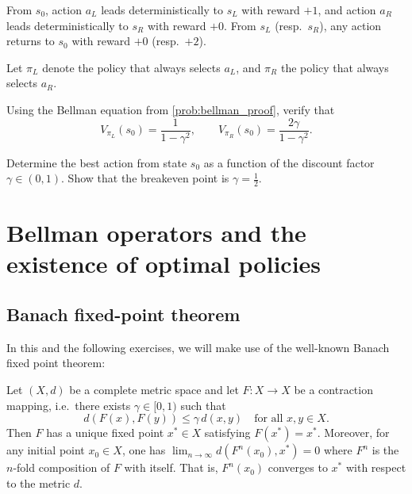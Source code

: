 \documentclass[11pt]{article}
\begin{document}
From $s_0$, action $a_L$ leads deterministically to $s_L$ with reward $+1$, and action $a_R$ leads deterministically to $s_R$ with reward $+0$. From $s_L$ (resp.\ $s_R$), any action returns to $s_0$ with reward $+0$ (resp.\ $+2$).

Let $\pi_L$ denote the policy that always selects $a_L$, and $\pi_R$ the policy that always selects $a_R$.

\begin{exercise}
\label{prob:small_mdp_values} Using the Bellman equation from \cref{prob:bellman_proof}, verify that
$$
V_{\pi_L}(s_0) = \frac{1}{1-\gamma^2}, \qquad V_{\pi_R}(s_0) = \frac{2\gamma}{1-\gamma^2}.
$$
\end{exercise}


\begin{exercise}
\label{prob:small_mdp_optimal} Determine the best action from state $s_0$ as a function of the discount factor $\gamma \in (0, 1)$. Show that the breakeven point is $\gamma = \tfrac{1}{2}$.
\end{exercise}


\section{Bellman operators and the existence of optimal policies}\label{prob:bellman_ops}

\subsection*{Banach fixed-point theorem}

In this and the following exercises, we will make use of the well-known Banach fixed point theorem:

\begin{theorem}\label{thm:banach}
Let $(X, d)$ be a complete metric space and let $F : X \to X$ be a contraction mapping, i.e.\ there exists $\gamma \in [0,1)$ such that
$$
d(F(x), F(y)) \le \gamma\, d(x, y) \quad \text{for all } x, y \in X.
$$
Then $F$ has a unique fixed point $x^* \in X$ satisfying $F(x^*) = x^*$. Moreover, for any initial point $x_0 \in X$, one 
has $\lim_{n \to \infty} d(F^n(x_0), x^*) = 0$ 
where $F^n$ is the $n$-fold composition of $F$ with itself. That is, $F^n(x_0)$ converges to $x^*$ with respect to the metric $d$.
\end{theorem}
\end{document}
